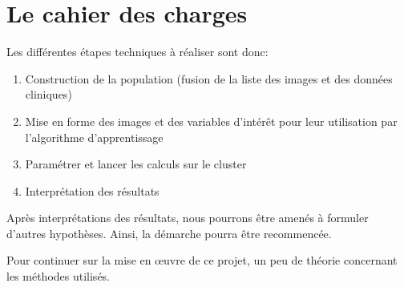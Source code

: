 \section{Le cahier des charges}

Les différentes étapes techniques à réaliser sont donc:
\begin{enumerate}
 \item Construction de la population (fusion de la liste des images et des données cliniques)
 \item Mise en forme des images et des variables d'intérêt pour leur utilisation par l'algorithme d'apprentissage
 \item Paramétrer et lancer les calculs sur le cluster
 \item Interprétation des résultats
\end{enumerate}


Après interprétations des résultats, nous pourrons être amenés à formuler d'autres hypothèses.
Ainsi, la démarche pourra être recommencée.

Pour continuer sur la mise en œuvre de ce projet, un peu de théorie concernant les méthodes utilisés. 